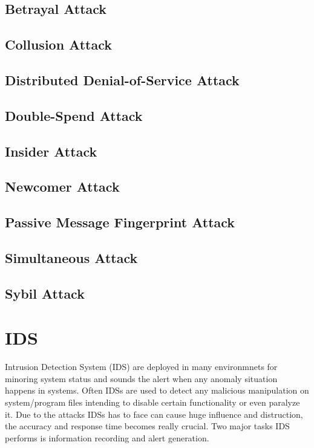 \documentclass[12pt]{report}
\begin{document}
\subsection{Betrayal Attack}
\subsection{Collusion Attack}
\subsection{Distributed Denial-of-Service Attack}
\subsection{Double-Spend Attack}
\subsection{Insider Attack}
\subsection{Newcomer Attack}
\subsection{Passive Message Fingerprint Attack}
\subsection{Simultaneous Attack}
\subsection{Sybil Attack}

\section{IDS}
Intrusion Detection System (IDS) \cite{NISRRIDPS} are deployed in many environmnets for minoring system status and sounds the alert when any anomaly situation happens in systems. Often IDSs are used to detect any malicious manipulation on system/program files intending to disable certain functionality or even paralyze it. Due to the attacks IDSs has to face can cause huge influence and distruction, the accuracy and response time becomes really crucial. Two major tasks IDS performs is information recording and alert generation. \\
\end{document}
